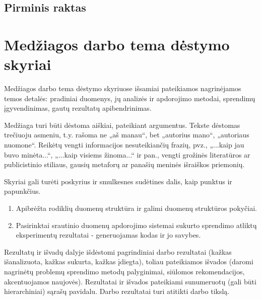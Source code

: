 \documentclass{VUMIFPSbakalaurinis}
\begin{document}
\subsection{Pirminis raktas}



\section{Medžiagos darbo tema dėstymo skyriai}
Medžiagos darbo tema dėstymo skyriuose išsamiai pateikiamos nagrinėjamos temos
detalės: pradiniai duomenys, jų analizės ir apdorojimo metodai, sprendimų
įgyvendinimas, gautų rezultatų apibendrinimas.

Medžiaga turi būti dėstoma aiškiai, pateikiant argumentus. Tekste dėstomas
trečiuoju asmeniu, t.y. rašoma ne „aš manau“, bet „autorius mano“, „autoriaus
nuomone“. Reikėtų vengti informacijos nesuteikiančių frazių, pvz., „...kaip jau
buvo minėta...“, „...kaip visiems žinoma...“ ir pan., vengti grožinės
literatūros ar publicistinio stiliaus, gausių metaforų ar panašių meninės
išraiškos priemonių.

Skyriai gali turėti poskyrius ir smulkesnes sudėtines dalis, kaip punktus ir
papunkčius.


\begin{enumerate}
    \item Apibrėžta rodiklių duomenų struktūra ir galimi duomenų struktūros pokyčiai.
    \item Pasirinktai srautinio duomenų apdorojimo sistemai sukurto sprendimo atliktų eksperimentų rezultatai - generuojamas kodas ir jo savybes. 
\end{enumerate}

Rezultatų ir išvadų dalyje išdėstomi pagrindiniai darbo rezultatai (kažkas
išanalizuota, kažkas sukurta, kažkas įdiegta), toliau pateikiamos išvados
(daromi nagrinėtų problemų sprendimo metodų palyginimai, siūlomos
rekomendacijos, akcentuojamos naujovės). Rezultatai ir išvados pateikiami
sunumeruotų (gali būti hierarchiniai) sąrašų pavidalu. Darbo rezultatai turi
atitikti darbo tikslą.

\printbibliography[heading=bibintoc] 


\appendix 
\end{document}

